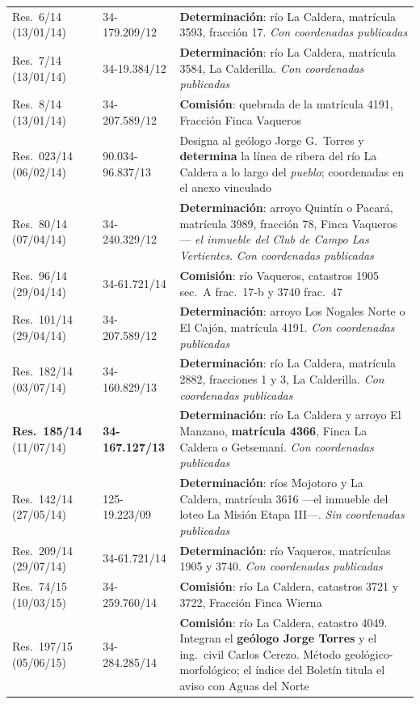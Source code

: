 {\begin{longtable}{@{}p{2.2cm}p{2.9cm}p{6.8cm}@{}}
Res.\ 6/14 (13/01/14) & 34-179.209/12 & \textbf{Determinación}: río La Caldera, matrícula 3593, fracción 17. \textit{Con coordenadas publicadas} \\
Res.\ 7/14 (13/01/14) & 34-19.384/12 & \textbf{Determinación}: río La Caldera, matrícula 3584, La Calderilla. \textit{Con coordenadas publicadas} \\
Res.\ 8/14 (13/01/14) & 34-207.589/12 & \textbf{Comisión}: quebrada de la matrícula 4191, Fracción Finca Vaqueros \\
Res.\ 023/14 (06/02/14) & 90.034-96.837/13 & Designa al geólogo Jorge G.\ Torres\index{Torres, Jorge G.} y \textbf{determina} la línea de ribera del río La Caldera a lo largo del \textit{pueblo}; coordenadas en el anexo vinculado \\
Res.\ 80/14 (07/04/14) & 34-240.329/12 & \textbf{Determinación}: arroyo Quintín o Pacará, matrícula 3989, fracción 78, Finca Vaqueros --- \textit{el inmueble del Club de Campo Las Vertientes}. \textit{Con coordenadas publicadas} \\
Res.\ 96/14 (29/04/14) & 34-61.721/14 & \textbf{Comisión}: río Vaqueros, catastros 1905 sec.\ A frac.\ 17-b y 3740 frac.\ 47 \\
Res.\ 101/14 (29/04/14) & 34-207.589/12 & \textbf{Determinación}: arroyo Los Nogales Norte o El Cajón, matrícula 4191. \textit{Con coordenadas publicadas} \\
Res.\ 182/14 (03/07/14) & 34-160.829/13 & \textbf{Determinación}: río La Caldera, matrícula 2882, fracciones 1 y 3, La Calderilla. \textit{Con coordenadas publicadas} \\
\textbf{Res.\ 185/14} (11/07/14) & \textbf{34-167.127/13} & \textbf{Determinación}: río La Caldera y arroyo El Manzano, \textbf{matrícula 4366}, Finca La Caldera o Getsemaní. \textit{Con coordenadas publicadas} \\
Res.\ 142/14 (27/05/14) & 125-19.223/09 & \textbf{Determinación}: ríos Mojotoro y La Caldera, matrícula 3616 ---el inmueble del loteo La Misión Etapa III---. \textit{Sin coordenadas publicadas} \\
Res.\ 209/14 (29/07/14) & 34-61.721/14 & \textbf{Determinación}: río Vaqueros, matrículas 1905 y 3740. \textit{Con coordenadas publicadas} \\
Res.\ 74/15 (10/03/15) & 34-259.760/14 & \textbf{Comisión}: río La Caldera, catastros 3721 y 3722, Fracción Finca Wierna \\
Res.\ 197/15 (05/06/15) & 34-284.285/14 & \textbf{Comisión}: río La Caldera, catastro 4049. Integran el \textbf{geólogo Jorge Torres} y el ing.\ civil Carlos Cerezo. Método geológico-morfológico; el índice del Boletín titula el aviso con Aguas del Norte \\

\end{longtable}}
